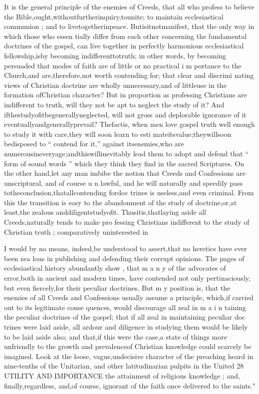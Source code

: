 \documentclass[
]{book}
\begin{document}
It is the general principle of the enemies of Creeds, that all who profess to believe the Bible,ought,withoutfurtherinquiry,tounite;
to maintain ecclesiastical communion ; and to
livetogetherinpeace. Butisitnotmanifest,
that the only way in which those who essen
tially differ from each other concerning the fundamental doctrines of the gospel, can live
together in perfectly harmonious ecclesiastical fellowship,isby becoming indifferenttotruth; in other words, by becoming persuaded that modes of faith are of little or no practical i m portance to the Church,and are,therefore,not
worth contending for; that clear and discrimi nating views of Christian doctrine are wholly unnecessary,and of littleuse in the formation ofChristian character? But in proportion as
professing Christians are indifferent to truth, will they not be apt to neglect the study of it? And ifthestudyofitbegenerallyneglected, will not gross and deplorable ignorance of it eventuallyandgenerallyprevail? Thefactis,
when men love gospel truth well enough to study it with care,they will soon learn to esti
mateitsvalue;theywillsoon bedisposed to
`` contend for it,'' against itsenemies,who are
numerousineveryage;andthiswillinevitably
lead them to adopt and defend that `` form of
sound words '' which they think they find in
the sacred Scriptures. On the other hand,let
any man imbibe the notion that Creeds and
Confessions are unscriptural, and of course u n
lawful, and he will naturally and speedily pass
totheconclusion,thatallcontending fordoc trines is useless,and even criminal. From
this the transition is easy to the abandonment of the study of doctrine,or,at least,the zealous
anddiligentstudyofit. Thusitis,thatlaying aside all Creeds,naturally tends to make pro fessing Christians indifferent to the study of Christian truth ; comparatively uninterested in

I would by no means, indeed,be understood to assert,that no heretics have ever been zea lous in publishing and defending their corrupt opinions. The pages of ecclesiastical history abundantly show , that m a n y of the advocates of error,both in ancient and modern times, have contended not only pertinaciously, but even fiercely,for their peculiar doctrines. But m y position is, that the enemies of all Creeds and Confessions usually assume a principle, which,if carried out to its legitimate conse quences, would discourage all zeal in m a i n
taining the peculiar doctrines of the gospel; that if all zeal in maintaining peculiar doc trines were laid aside, all ardour and diligence
in studying them would be likely to be laid aside also; and that,if this were the case,a
state of things more unfriendly to the growth and prevalenceof Christian knowledge could scarcely be imagined. Look at the loose, vague,undecisive character of the preaching heard in nine-tenths of the Unitarian, and
other latitudinarian pulpits in the United
28 UTILITY AND IMPORTANCE
the attainment of religious knowledge ; and, finally,regardless, and,of course, ignorant of
the faith once delivered to the saints."
\end{document}
